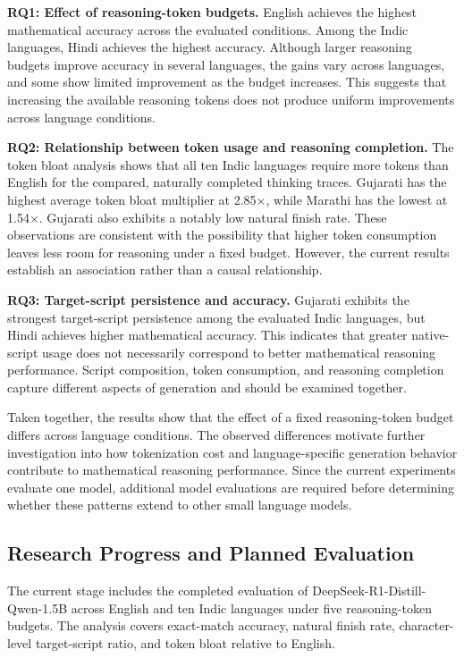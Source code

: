 \documentclass[11pt]{article}
\begin{document}
\textbf{RQ1: Effect of reasoning-token budgets.}
English achieves the highest mathematical accuracy across the evaluated conditions. Among the Indic languages, Hindi achieves the highest accuracy. Although larger reasoning budgets improve accuracy in several languages, the gains vary across languages, and some show limited improvement as the budget increases. This suggests that increasing the available reasoning tokens does not produce uniform improvements across language conditions.

\textbf{RQ2: Relationship between token usage and reasoning completion.}
The token bloat analysis shows that all ten Indic languages require more tokens than English for the compared, naturally completed thinking traces. Gujarati has the highest average token bloat multiplier at 2.85$\times$, while Marathi has the lowest at 1.54$\times$. Gujarati also exhibits a notably low natural finish rate. These observations are consistent with the possibility that higher token consumption leaves less room for reasoning under a fixed budget. However, the current results establish an association rather than a causal relationship.

\textbf{RQ3: Target-script persistence and accuracy.}
Gujarati exhibits the strongest target-script persistence among the evaluated Indic languages, but Hindi achieves higher mathematical accuracy. This indicates that greater native-script usage does not necessarily correspond to better mathematical reasoning performance. Script composition, token consumption, and reasoning completion capture different aspects of generation and should be examined together.

Taken together, the results show that the effect of a fixed reasoning-token budget differs across language conditions. The observed differences motivate further investigation into how tokenization cost and language-specific generation behavior contribute to mathematical reasoning performance. Since the current experiments evaluate one model, additional model evaluations are required before determining whether these patterns extend to other small language models.

\subsection{Research Progress and Planned Evaluation}
The current stage includes the completed evaluation of DeepSeek-R1-Distill-Qwen-1.5B across English and ten Indic languages under five reasoning-token budgets. The analysis covers exact-match accuracy, natural finish rate, character-level target-script ratio, and token bloat relative to English.
\end{document}
